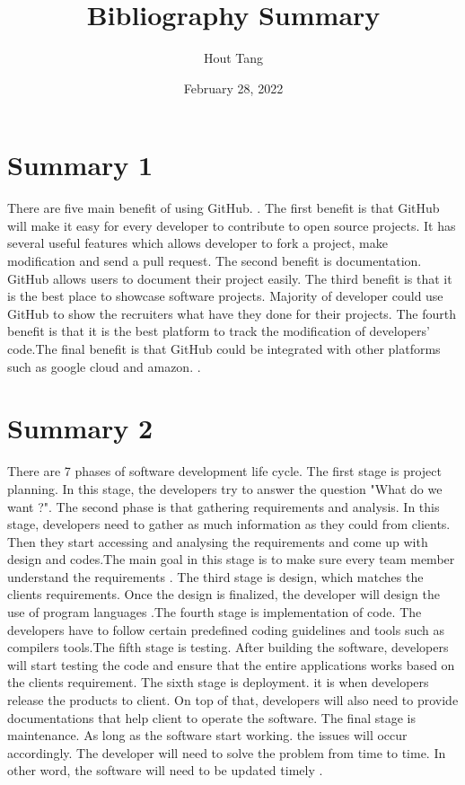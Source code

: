 \documentclass{article}
\title{Bibliography Summary}
\author{Hout Tang}
\date{February 28, 2022}
\begin{document}
\maketitle

\section*{Summary 1}

There are five main benefit of using GitHub.  \cite{ApiumhubpArticle}. The first benefit is that GitHub will make it easy for every developer to contribute to open source projects. It has several useful features which allows developer to fork a project, make modification and send a pull request. The second benefit is documentation. GitHub allows users to document their project easily. The third benefit is that it is the best place to showcase software projects. Majority of developer could use GitHub to show the recruiters what have they done for their projects. The fourth benefit is that it is the best platform to track the modification of developers' code.The final benefit is that GitHub could be integrated with other platforms such as google cloud and amazon. \cite{ChandramohanJagtapArticle}.


\medskip

\section*{Summary 2}

There are 7 phases of software development life cycle. The first stage is project planning. In this stage, the developers try to answer the question "What do we want ?". The second phase is that gathering requirements and analysis. In this stage, developers need to gather as much information as they could from clients. Then they start accessing and analysing the requirements and come up with design and codes.The main goal in this stage is to make sure every team member understand the requirements \cite{BetsolArticle}. The third stage is design, which matches the clients requirements. Once the design is finalized, the developer will design the use of program languages \cite{BetsolArticle}.The fourth stage is implementation of code. The developers have to follow certain predefined coding guidelines and tools such as compilers tools.The fifth stage is testing. After building the software, developers will start testing the code and ensure that the entire applications works based on the clients requirement. The sixth stage is deployment. it is when developers release the products to client. On top of that, developers will also need to provide documentations that help client to operate the software. The final stage is maintenance. As long as the software start working. the issues will occur accordingly. The developer will need to solve the problem from time to time. In other word, the software will need to be updated timely \cite{BetsolArticle}.


\printbibliography
\end{document}
